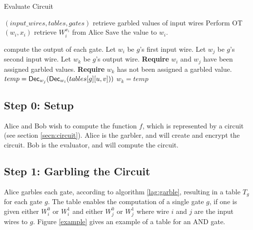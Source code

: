 \begin{algorithm}
\caption{Evaluate Circuit}
\label{alg:evaluate}
\begin{algorithmic}

\Require $(input\_wires, tables, gates)$
	\Comment retrieve garbled values of input wires
	\State Perform OT$(w_i, x_i)$ 
	\Comment retrieve $W^{x_i}_i$ from Alice
	\State Save the value to $w_i$.
\EndFor

	\Comment compute the output of each gate.
	\State Let $w_i$ be $g$'s first input wire.
	\State Let $w_j$ be $g$'s second input wire.
	\State Let $w_k$ be $g$'s output wire.
	\State \textbf{Require} $w_i$ and $w_j$ have been assigned garbled values.
	\State \textbf{Require} $w_k$ has not been assigned a garbled value.
		\State $temp = \textsf{Dec}_{w_j}(\textsf{Dec}_{w_i}(tables[g][u,v]))$
			\State $w_k = temp$
		\EndIf
	\EndFor
\EndFor
\end{algorithmic}
\end{algorithm}

\subsection{Step 0: Setup}
Alice and Bob wish to compute the function $f$, which is represented by a circuit (see section \ref{secn:circuit}).
Alice is the garbler, and will create and encrypt the circuit.
Bob is the evaluator, and will compute the circuit.

\subsection{Step 1: Garbling the Circuit}
Alice garbles each gate, according to algorithm \ref{lag:garble}, resulting in a table $T_g$ for each gate $g$.
The table enables the computation of a single gate $g$, if one is given either $W^0_i$ or $W^1_i$ and either $W^0_j$ or $W^1_j$ where wire $i$ and $j$ are the input wires to $g$.
Figure \ref{example} gives an example of a table for an AND gate.


